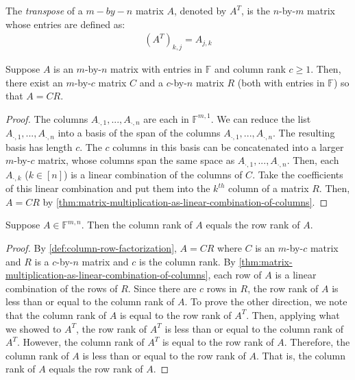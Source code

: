 \documentclass{article}
\begin{document}
\begin{definition}[transpose]
  \label{def:matrix-transpose}
  The \textit{transpose} of a $m-by-n$ matrix $A$, denoted by $A^T$, is the
  $n$-by-$m$ matrix whose entries are defined as:
  \begin{align*}
    (A^T)_{k,j} = A_{j, k}
  \end{align*}
\end{definition}

\begin{theorem}
  \label{def:column-row-factorization}
  Suppose $A$ is an $m$-by-$n$ matrix with entries in $\mathbb{F}$ and
  column rank $c \ge 1$. Then, there exist an $m$-by-$c$ matrix $C$
  and a $c$-by-$n$ matrix $R$ (both with entries in $\mathbb{F}$) so that $A = CR$.
\end{theorem}
\begin{proof}
  The columns $A_{\cdot, 1}, ..., A_{\cdot, n}$ are each in
  $\mathbb{F}^{m,1}$. We can reduce the list $A_{\cdot, 1}, ...,
  A_{\cdot, n}$ into a basis of the span of the columns $A_{\cdot, 1},
  ..., A_{\cdot, n}$. The resulting basis has length $c$. The $c$
  columns in this basis can be concatenated into a larger $m$-by-$c$
  matrix, whose columns span the same space as $A_{\cdot, 1}, ...,
  A_{\cdot, n}$. Then, each $A_{\cdot, k}$ ($k \in [n]$) is a linear
  combination of the columns of $C$. Take the coefficients of this
  linear combination and put them into the $k^{th}$ column of a matrix
  $R$. Then, $A = CR$ by
  \cref{thm:matrix-multiplication-as-linear-combination-of-columns}. 
\end{proof}

\begin{theorem}
  \label{def:column-rank-equals-row-rank}
  Suppose $A \in \mathbb{F}^{m, n}$. Then the column rank of $A$
  equals the row rank of $A$.
\end{theorem}
\begin{proof}
  By \cref{def:column-row-factorization}, $A = CR$ where $C$ is an
  $m$-by-$c$ matrix and $R$ is a $c$-by-$n$ matrix and $c$ is the
  column rank. By
  \cref{thm:matrix-multiplication-as-linear-combination-of-columns},
  each row of $A$ is a linear combination of the rows of $R$. Since
  there are $c$ rows in $R$, the row rank of $A$ is less than or equal
  to the column rank of $A$. To prove the other direction, we note
  that the column rank of $A$ is equal to the row rank of
  $A^{T}$. Then, applying what we showed to $A^T$, the row rank of
  $A^T$ is less than or equal to the column rank of $A^T$. However,
  the column rank of $A^T$ is equal to the row rank of $A$. Therefore,
  the column rank of $A$ is less than or equal to the row rank of
  $A$. That is, the column rank of $A$ equals the row rank of $A$.
\end{proof}
\end{document}
